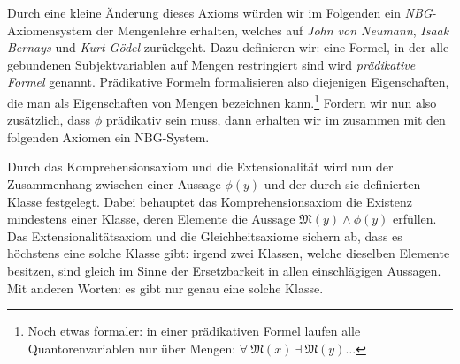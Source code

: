 \documentclass[a4paper,german,10pt,twoside]{book}
\theoremstyle{definition}
\theoremstyle{remark}
\begin{document}
Durch eine kleine {\"A}nderung dieses Axioms w{\"u}rden wir im Folgenden ein \emph{NBG}-Axiomensystem der Mengenlehre erhalten, welches auf \emph{John von Neumann}, \emph{Isaak Bernays} und \emph{Kurt G{\"o}del} zur{\"u}ckgeht.
Dazu definieren wir: eine Formel, in der alle gebundenen Subjektvariablen auf Mengen restringiert sind wird \emph{pr{\"a}dikative Formel} genannt. Pr{\"a}dikative Formeln formalisieren also diejenigen Eigenschaften, die man als {\glqq Eigenschaften von Mengen\grqq} bezeichnen kann.\footnote{Noch etwas formaler: in einer pr{\"a}dikativen Formel laufen alle Quantorenvariablen nur {\"u}ber Mengen: $\forall \ \mathfrak{M}(x) \ \exists \ \mathfrak{M}(y) \ldots$}
Fordern wir nun also zus{\"a}tzlich, dass $\phi$ pr{\"a}dikativ sein muss, dann erhalten wir im zusammen mit den folgenden Axiomen ein NBG-System.


\par
Durch das Komprehensionsaxiom und die Extensionalit{\"a}t wird nun der Zusammenhang zwischen einer Aussage $\phi(y)$ und der durch sie definierten Klasse festgelegt. Dabei behauptet das Komprehensionsaxiom die Existenz mindestens einer Klasse, deren Elemente die Aussage $\mathfrak{M}(y) \land \phi(y)$ erf{\"u}llen. Das Extensionalit{\"a}tsaxiom und die Gleichheitsaxiome sichern ab, dass es h{\"o}chstens eine solche Klasse gibt: irgend zwei Klassen, welche dieselben Elemente besitzen, sind gleich im Sinne der Ersetzbarkeit in allen einschl{\"a}gigen Aussagen. Mit anderen Worten: es gibt nur genau eine solche Klasse.
\end{document}
